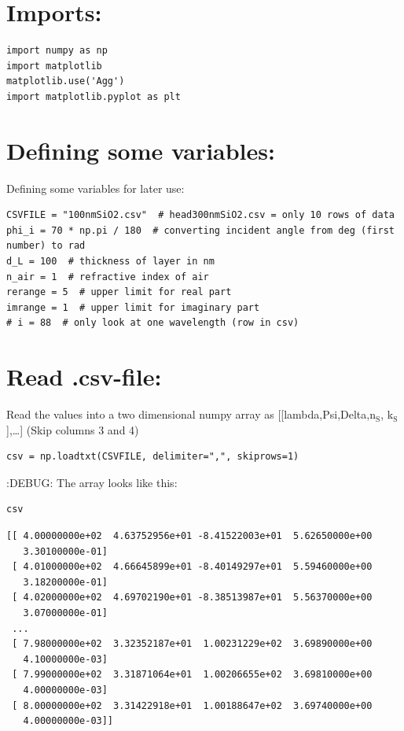 \documentclass[11pt]{article}
\begin{document}
\section{Imports:}
\label{sec:org42b68b1}
\begin{verbatim}
import numpy as np
import matplotlib
matplotlib.use('Agg')
import matplotlib.pyplot as plt
\end{verbatim}

\section{Defining some variables:}
\label{sec:org8bbb179}
Defining some variables for later use:

\begin{verbatim}
CSVFILE = "100nmSiO2.csv"  # head300nmSiO2.csv = only 10 rows of data
phi_i = 70 * np.pi / 180  # converting incident angle from deg (first number) to rad
d_L = 100  # thickness of layer in nm
n_air = 1  # refractive index of air
rerange = 5  # upper limit for real part
imrange = 1  # upper limit for imaginary part
# i = 88  # only look at one wavelength (row in csv)
\end{verbatim}

\section{Read .csv-file:}
\label{sec:org95190ec}
Read the values into a two dimensional numpy array as [[lambda,Psi,Delta,n\(_{\text{S}}\), k\(_{\text{S}}\)],\ldots{}] (Skip columns 3 and 4)

\begin{verbatim}
csv = np.loadtxt(CSVFILE, delimiter=",", skiprows=1)
\end{verbatim}

:DEBUG:
The array looks like this:
\begin{verbatim}
csv
\end{verbatim}

\begin{verbatim}
[[ 4.00000000e+02  4.63752956e+01 -8.41522003e+01  5.62650000e+00
   3.30100000e-01]
 [ 4.01000000e+02  4.66645899e+01 -8.40149297e+01  5.59460000e+00
   3.18200000e-01]
 [ 4.02000000e+02  4.69702190e+01 -8.38513987e+01  5.56370000e+00
   3.07000000e-01]
 ...
 [ 7.98000000e+02  3.32352187e+01  1.00231229e+02  3.69890000e+00
   4.10000000e-03]
 [ 7.99000000e+02  3.31871064e+01  1.00206655e+02  3.69810000e+00
   4.00000000e-03]
 [ 8.00000000e+02  3.31422918e+01  1.00188647e+02  3.69740000e+00
   4.00000000e-03]]
\end{verbatim}
\end{document}
